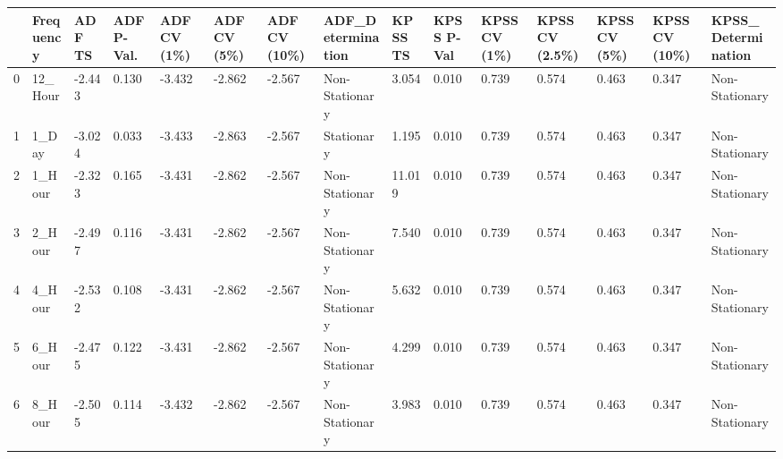 \begin{tabular}{lllllllllllllll}
\toprule
 & Frequency & ADF TS & ADF P-Val. & ADF CV (1\%) & ADF CV (5\%) & ADF CV (10\%) & ADF_Determination & KPSS TS & KPSS P-Val & KPSS CV (1\%) & KPSS CV (2.5\%) & KPSS CV (5\%) & KPSS CV (10\%) & KPSS_Determination \\
\midrule
0 & 12_Hour & -2.443 & 0.130 & -3.432 & -2.862 & -2.567 & Non-Stationary & 3.054 & 0.010 & 0.739 & 0.574 & 0.463 & 0.347 & Non-Stationary \\
1 & 1_Day & -3.024 & 0.033 & -3.433 & -2.863 & -2.567 & Stationary & 1.195 & 0.010 & 0.739 & 0.574 & 0.463 & 0.347 & Non-Stationary \\
2 & 1_Hour & -2.323 & 0.165 & -3.431 & -2.862 & -2.567 & Non-Stationary & 11.019 & 0.010 & 0.739 & 0.574 & 0.463 & 0.347 & Non-Stationary \\
3 & 2_Hour & -2.497 & 0.116 & -3.431 & -2.862 & -2.567 & Non-Stationary & 7.540 & 0.010 & 0.739 & 0.574 & 0.463 & 0.347 & Non-Stationary \\
4 & 4_Hour & -2.532 & 0.108 & -3.431 & -2.862 & -2.567 & Non-Stationary & 5.632 & 0.010 & 0.739 & 0.574 & 0.463 & 0.347 & Non-Stationary \\
5 & 6_Hour & -2.475 & 0.122 & -3.431 & -2.862 & -2.567 & Non-Stationary & 4.299 & 0.010 & 0.739 & 0.574 & 0.463 & 0.347 & Non-Stationary \\
6 & 8_Hour & -2.505 & 0.114 & -3.432 & -2.862 & -2.567 & Non-Stationary & 3.983 & 0.010 & 0.739 & 0.574 & 0.463 & 0.347 & Non-Stationary \\
\bottomrule
\end{tabular}
